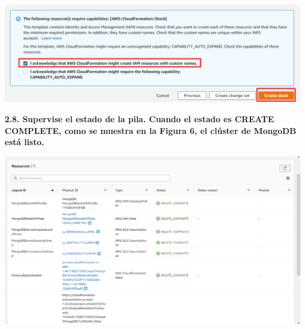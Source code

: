 \documentclass{article}
\begin{document}
    \begin{center}
		\includegraphics[width=15cm]{./images/16} 
	\end{center}

\newpage
\textbf{2.8. Supervise el estado de la pila. Cuando el estado es CREATE COMPLETE, como se muestra en la Figura 6, el clúster de MongoDB está listo.
}

    \begin{center}
		\includegraphics[width=15cm]{./images/17} 
	\end{center}
\end{document}
